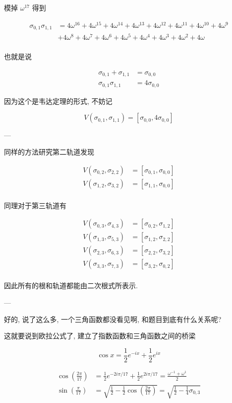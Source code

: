 模掉 $ω^{17}$ 得到

$$
\begin{aligned}
σ_{0,1}σ_{1,1}
&=4 ω^{16}+4 ω^{15}+4 ω^{14}+4 ω^{13}+4 ω^{12}+4 ω^{11}+4 ω^{10}+4 ω^9\\
&+4 ω^8+4 ω^7+4 ω^6+4 ω^5+4 ω^4+4 ω^3+4 ω^2+4 ω\\
\end{aligned}
$$

也就是说 

$$
\begin{aligned}
σ_{0,1}+σ_{1,1}&=σ_{0,0}\\
σ_{0,1}σ_{1,1}&=4σ_{0,0}
\end{aligned}
$$

因为这个是韦达定理的形式, 不妨记 

$$
V(σ_{0,1}, σ_{1,1}) = [σ_{0,0} , 4 σ_{0,0}]
$$

---

同样的方法研究第二轨道发现

$$
\begin{aligned}
V(σ_{0,2}, σ_{2,2})&=[σ_{0,1}, σ_{0,0}]\\
V(σ_{1,2}, σ_{3,2})&=[σ_{1,1}, σ_{0,0}]\\
\end{aligned}
$$

同理对于第三轨道有

$$
\begin{aligned}
V(σ_{0,3}, σ_{4,3})&=[σ_{0,2}, σ_{1,2}]\\
V(σ_{1,3}, σ_{5,3})&=[σ_{1,2}, σ_{2,2}]\\
V(σ_{2,3}, σ_{6,3})&=[σ_{2,2}, σ_{3,2}]\\
V(σ_{3,3}, σ_{7,3})&=[σ_{3,2}, σ_{0,2}]\\
\end{aligned}
$$

因此所有的根和轨道都能由二次根式所表示.


---

好的, 说了这么多, 一个三角函数都没看见啊, 和题目到底有什么关系呢?


这就要说到欧拉公式了, 建立了指数函数和三角函数之间的桥梁

$$
\cos x=\frac{1}{2}e^{-ix}+\frac{1}{2}e^{ix}
$$

$$
\begin{aligned}
\cos \left(\frac{2 π }{17}\right)&=\frac{1}{2}e^{-2 i π/17}+\frac{1}{2}e^{2 i π/17}=\frac{ω^{-1}+ω^1}{2}\\
\sin \left(\frac{π }{17}\right)&=\sqrt{\frac{1}{2}-\frac{1}{2} \cos \left(\frac{2 π }{17}\right)}=\sqrt{\frac{1}{2}-\frac{1}{4}σ_{0,3}}
\end{aligned}
$$

